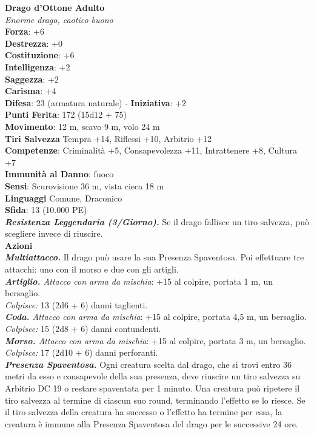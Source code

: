 \begin{multicols}{2}
\medskip\textbf{Drago d'Ottone Adulto}\\
\emph{Enorme drago, caotico buono}\\
\textbf{Forza}: +6\\
\textbf{Destrezza}: +0\\
\textbf{Costituzione}: +6\\
\textbf{Intelligenza}: +2\\
\textbf{Saggezza}: +2\\
\textbf{Carisma}: +4\\
\textbf{Difesa}: 23 (armatura naturale) - \textbf{Iniziativa}: +2\\
\textbf{Punti Ferita}: 172 (15d12 + 75)\\
\textbf{Movimento}: 12 m, scavo 9 m, volo 24 m\\
\textbf{Tiri Salvezza} Tempra +14, Riflessi +10, Arbitrio +12\\
\textbf{Competenze}: Criminalità +5, Consapevolezza +11, Intrattenere +8, Cultura +7\\
\textbf{Immunità al Danno}: fuoco\\
\textbf{Sensi}: Scurovisione 36 m, vista cieca 18 m\\
\textbf{Linguaggi} Comune, Draconico\\
\textbf{Sfida}: 13 (10.000 PE)\smallskip\\
\emph{\textbf{Resistenza Leggendaria (3/Giorno).}} Se il drago fallisce un tiro salvezza, può scegliere invece di riuscire.\\
\smallskip\textbf{Azioni}\\
\emph{\textbf{Multiattacco.}} Il drago può usare la sua Presenza Spaventosa. Poi effettuare tre attacchi: uno con il morso e due con gli artigli.\\
\emph{\textbf{Artiglio.} Attacco con arma da mischia}: +15 al colpire, portata 1 m, un bersaglio.\\
\emph{Colpisce:} 13 (2d6 + 6) danni taglienti.\\
\emph{\textbf{Coda.} Attacco con arma da mischia}: +15 al colpire, portata 4,5 m, un bersaglio.\\
\emph{Colpisce:} 15 (2d8 + 6) danni contundenti.\\
\emph{\textbf{Morso.} Attacco con arma da mischia}: +15 al colpire, portata 3 m, un bersaglio.\\
\emph{Colpisce:} 17 (2d10 + 6) danni perforanti.\\
\emph{\textbf{Presenza Spaventosa.}} Ogni creatura scelta dal drago, che si trovi entro 36 metri da esso e consapevole della sua presenza, deve riuscire un tiro salvezza su Arbitrio DC  19 o restare spaventata per 1 minuto. Una creatura può ripetere il tiro salvezza al termine di ciascun suo round, terminando l'effetto se lo riesce. Se il tiro salvezza della creatura ha successo o l'effetto ha termine per essa, la creatura è immune alla Presenza Spaventosa del drago per le successive 24 ore.\\

\end{multicols}
